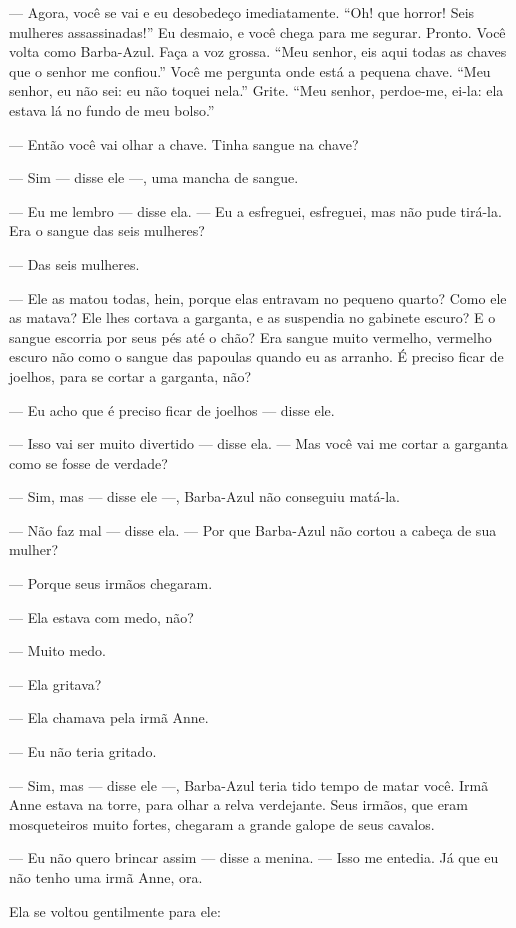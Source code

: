 --- Agora, você se vai e eu desobedeço imediatamente. “Oh! que horror!
Seis mulheres assassinadas!” Eu desmaio, e você chega para me segurar.
Pronto. Você volta como Barba-Azul. Faça a voz grossa. “Meu senhor, eis
aqui todas as chaves que o senhor me confiou.” Você me pergunta onde está
a pequena chave. “Meu senhor, eu não sei: eu não toquei nela.” Grite. “Meu
senhor, perdoe-me, ei-la: ela estava lá no fundo de meu bolso.”

--- Então você vai olhar a chave. Tinha sangue na chave?

--- Sim --- disse ele ---, uma mancha de sangue.

--- Eu me lembro --- disse ela. --- Eu a esfreguei, esfreguei, mas não pude
tirá-la. Era o sangue das seis mulheres?

--- Das seis mulheres.

--- Ele as matou todas, hein, porque elas entravam no pequeno quarto?
Como ele as matava? Ele lhes cortava a garganta, e as suspendia no
gabinete escuro? E o sangue escorria por seus pés até o chão? Era sangue
muito vermelho, vermelho escuro não como o sangue das papoulas quando eu
as arranho. É preciso ficar de joelhos, para se cortar a garganta, não?

--- Eu acho que é preciso ficar de joelhos --- disse ele.

--- Isso vai ser muito divertido --- disse ela. --- Mas você vai me cortar a
garganta como se fosse de verdade?

--- Sim, mas --- disse ele ---, Barba-Azul não conseguiu matá-la.

--- Não faz mal --- disse ela. --- Por que Barba-Azul não cortou a cabeça de
sua mulher?

--- Porque seus irmãos chegaram.

--- Ela estava com medo, não?

--- Muito medo.

--- Ela gritava?

--- Ela chamava pela irmã Anne.

--- Eu não teria gritado.

--- Sim, mas --- disse ele ---, Barba-Azul teria tido tempo de matar você. Irmã
Anne estava na torre, para olhar a relva verdejante. Seus irmãos, que eram
mosqueteiros muito fortes, chegaram a grande galope de seus cavalos.

--- Eu não quero brincar assim --- disse a menina. --- Isso me entedia. Já que
eu não tenho uma irmã Anne, ora.

Ela se voltou gentilmente para ele:

